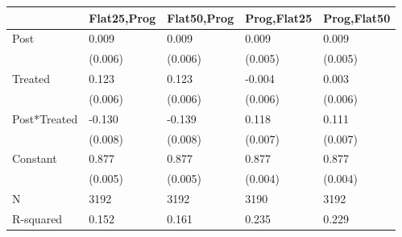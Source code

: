 \begin{tabular}{lllll}
\toprule
 & Flat25,Prog & Flat50,Prog & Prog,Flat25 & Prog,Flat50 \\
\midrule
Post & 0.009 & 0.009 & 0.009 & 0.009 \\
 & (0.006) & (0.006) & (0.005) & (0.005) \\
Treated & 0.123 & 0.123 & -0.004 & 0.003 \\
 & (0.006) & (0.006) & (0.006) & (0.006) \\
Post*Treated & -0.130 & -0.139 & 0.118 & 0.111 \\
 & (0.008) & (0.008) & (0.007) & (0.007) \\
Constant & 0.877 & 0.877 & 0.877 & 0.877 \\
 & (0.005) & (0.005) & (0.004) & (0.004) \\
N & 3192 & 3192 & 3190 & 3192 \\
R-squared & 0.152 & 0.161 & 0.235 & 0.229 \\
\bottomrule
\end{tabular}

